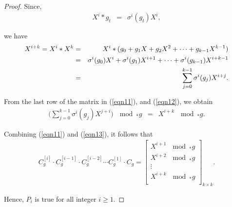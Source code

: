 \documentclass[10pt,a4paper]{amsart}
\begin{document}
\begin{proof}
	Since,
	\begin{eqnarray*}
		X^i*g_t&=&\sigma^i(g_t)X^i,
	\end{eqnarray*}
    
	we have
	\begin{eqnarray}\label{eqn12}
		X^{i+k}=X^i\ast X^k\notag&=& X^i*(g_0+g_1X+g_2X^2+\cdots+g_{k-1}X^{k-1})\\
\notag&=&\sigma^i(g_0)X^i+\sigma^i(g_1)X^{i+1}+\cdots+\sigma^i(g_{k-1})X^{i+k-1}\\
		&=&\sum_{j=0}^{k-1}\sigma^i (g_j)X^{i+j}.
	\end{eqnarray}
    
	From the last row of the matrix in (\ref{eqn11}), and (\ref{eqn12}), we obtain
	\begin{eqnarray}\label{eqn13}
		\Big(\sum_{j=0}^{k-1}\sigma^{i}(g_j)X^{j+i}\Big)~ \mod _*g  &=&X^{i+k}~ \mod _*g.
	\end{eqnarray}

Combining (\ref{eqn11}) and  (\ref{eqn13}), it follows that
	\begin{eqnarray}\label{eqn202}
		C_g^{[i]}\cdot 	C_g^{[i-1]}\cdot C_g^{[i-2]}\cdots C_g^{[1]}\cdot C_g=\begin{bmatrix}
			X^{i+1} ~ \mod _*g  \\
			X^{i+2} ~ \mod _*g  \\
			\vdots\\
			X^{i+k} ~ \mod _*g  \\
		\end{bmatrix}_{k\times k}.
	\end{eqnarray}
    
	Hence, $P_i$ is true for all integer $i\geq 1.$
\end{proof}
\end{document}
